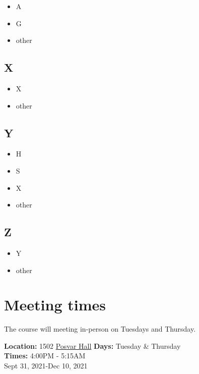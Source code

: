 \documentclass[
]{book}
\providecommand{\tightlist}{%
  \setlength{\itemsep}{0pt}\setlength{\parskip}{0pt}}
\begin{document}
\begin{itemize}
\tightlist
\item
  A
\item
  G
\item
  other
\end{itemize}

\hypertarget{x}{%
\section{X}\label{x}}

\begin{itemize}
\tightlist
\item
  X
\item
  other
\end{itemize}

\hypertarget{y}{%
\section{Y}\label{y}}

\begin{itemize}
\tightlist
\item
  H
\item
  S
\item
  X
\item
  other
\end{itemize}

\hypertarget{z}{%
\section{Z}\label{z}}

\begin{itemize}
\tightlist
\item
  Y
\item
  other
\end{itemize}

\hypertarget{meeting-times}{%
\chapter{Meeting times}\label{meeting-times}}

The course will meeting in-person on Tuesdays and Thursday.

\textbf{Location:} 1502 \href{https://www.tour.pitt.edu/tour/wesley-w-posvar-hall}{Posvar Hall}
\textbf{Days:} Tuesday \& Thursday\\
\textbf{Times:} 4:00PM - 5:15AM\\
Sept 31, 2021-Dec 10, 2021
\end{document}
